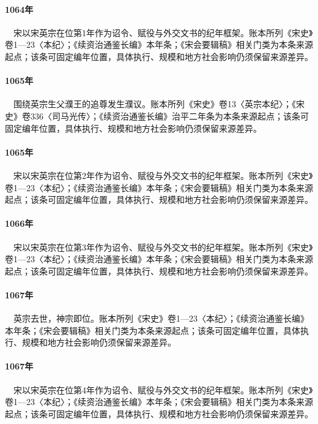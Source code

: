 \paragraph{1064年}　宋以宋英宗在位第1年作为诏令、赋役与外交文书的纪年框架。账本所列《宋史》卷1—23〈本纪〉；《续资治通鉴长编》本年条；《宋会要辑稿》相关门类为本条来源起点；该条可固定编年位置，具体执行、规模和地方社会影响仍须保留来源差异。

\paragraph{1065年}　围绕英宗生父濮王的追尊发生濮议。账本所列《宋史》卷13〈英宗本纪〉；《宋史》卷336〈司马光传〉；《续资治通鉴长编》治平二年条为本条来源起点；该条可固定编年位置，具体执行、规模和地方社会影响仍须保留来源差异。

\paragraph{1065年}　宋以宋英宗在位第2年作为诏令、赋役与外交文书的纪年框架。账本所列《宋史》卷1—23〈本纪〉；《续资治通鉴长编》本年条；《宋会要辑稿》相关门类为本条来源起点；该条可固定编年位置，具体执行、规模和地方社会影响仍须保留来源差异。

\paragraph{1066年}　宋以宋英宗在位第3年作为诏令、赋役与外交文书的纪年框架。账本所列《宋史》卷1—23〈本纪〉；《续资治通鉴长编》本年条；《宋会要辑稿》相关门类为本条来源起点；该条可固定编年位置，具体执行、规模和地方社会影响仍须保留来源差异。

\paragraph{1067年}　英宗去世，神宗即位。账本所列《宋史》卷1—23〈本纪〉；《续资治通鉴长编》本年条；《宋会要辑稿》相关门类为本条来源起点；该条可固定编年位置，具体执行、规模和地方社会影响仍须保留来源差异。

\paragraph{1067年}　宋以宋英宗在位第4年作为诏令、赋役与外交文书的纪年框架。账本所列《宋史》卷1—23〈本纪〉；《续资治通鉴长编》本年条；《宋会要辑稿》相关门类为本条来源起点；该条可固定编年位置，具体执行、规模和地方社会影响仍须保留来源差异。

